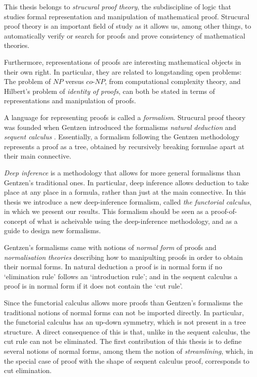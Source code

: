 This thesis belongs to \emph{strucural proof theory}, the subdiscipline of logic that studies formal representation and manipulation of mathematical proof. Strucural proof theory is an important field of study as it allows us, among other things, to automatically verify or search for proofs and prove consistency of mathematical theories.

Furthermore, representations of proofs are interesting mathematical objects in their own right. In particular, they are related to longstanding open problems: The problem of $NP$ versus $co$-$NP$, from computational complexity theory, and Hilbert's problem of \emph{identity of proofs}, can both be stated in terms of representations and manipulation of proofs.

A language for representing proofs is called a \emph{formalism}. Strucural proof theory was founded when Gentzen introduced the formalisms \emph{natural deduction} and \emph{sequent calculus} \cite{Gent:69:Investig:xi}. Essentially, a formalism following the Gentzen methodology represents a proof as a tree, obtained by recursively breaking formulae apart at their main connective.

\emph{Deep inference} \cite{Gugl:06:A-System:kl} is a methodology that allows for more general formalisms than Gentzen's traditional ones. In particular, deep inference allows deduction to take place at any place in a formula, rather than just at the main connective. In this thesis we introduce a new deep-inference formalism, called \emph{the functorial calculus}, in which we present our results. This formalism should be seen as a proof-of-concept of what is acheivable using the deep-inference methodology, and as a guide to design new formalisms.

Gentzen's formalisms came with notions of \emph{normal form} of proofs and \emph{normalisation theories} describing how to manipulting proofs in order to obtain their normal forms. In natural deduction a proof is in normal form if no `elimination rule' follows an `introduction rule'; and in the sequent calculus a proof is in normal form if it does not contain the `cut rule'.

Since the functorial calculus allows more proofs than Gentzen's formalisms the traditional notions of normal forms can not be imported directly. In particular, the functorial calculus has an up-down symmetry, which is not present in a tree structure. A direct consequence of this is that, unlike in the sequent calculus, the cut rule can not be eliminated. The first contribution of this thesis is to define several notions of normal forms, among them the notion of \emph{streamlining}, which, in the special case of proof with the shape of sequent calculus proof, corresponds to cut elimination.


